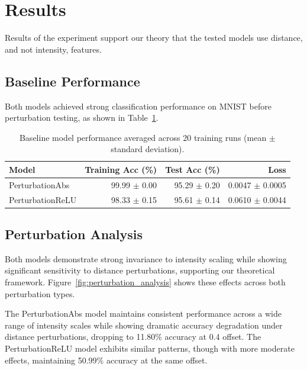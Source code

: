 \section{Results}

Results of the experiment support our theory that the tested models use distance, and not intensity, features.

\subsection{Baseline Performance}


Both models achieved strong classification performance on MNIST before perturbation testing, as shown in Table~\ref{tab:baseline}.

\begin{table}[h]
\centering
\begin{tabular}{lrrr}
\hline
Model & Training Acc (\%) & Test Acc (\%) & Loss \\
\hline
PerturbationAbs & 99.99 $\pm$ 0.00 & 95.29 $\pm$ 0.20 & 0.0047 $\pm$ 0.0005 \\
PerturbationReLU & 98.33 $\pm$ 0.15 & 95.61 $\pm$ 0.14 & 0.0610 $\pm$ 0.0044 \\
\hline
\end{tabular}
\caption{Baseline model performance averaged across 20 training runs (mean $\pm$ standard deviation).}
\label{tab:baseline}
\end{table}

\subsection{Perturbation Analysis}

Both models demonstrate strong invariance to intensity scaling while showing significant sensitivity to distance perturbations, supporting our theoretical framework. Figure~\ref{fig:perturbation_analysis} shows these effects across both perturbation types.

The PerturbationAbs model maintains consistent performance across a wide range of intensity scales while showing dramatic accuracy degradation under distance perturbations, dropping to 11.80\% accuracy at 0.4 offset. The PerturbationReLU model exhibits similar patterns, though with more moderate effects, maintaining 50.99\% accuracy at the same offset.

